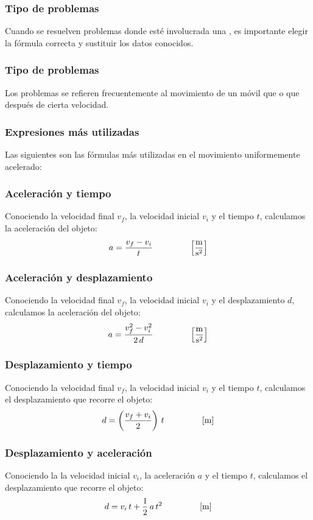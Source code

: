 \documentclass[14pt]{beamer}
\begin{document}
\begin{frame}
\frametitle{Tipo de problemas}
Cuando se resuelven problemas donde esté involucrada una , \pause es importante elegir la fórmula correcta y sustituir los datos conocidos.
\end{frame}
\begin{frame}
\frametitle{Tipo de problemas}
Los problemas se refieren frecuentemente al movimiento de un móvil que  o que  después de cierta velocidad.
\end{frame}
\begin{frame}
\frametitle{Expresiones más utilizadas}
Las siguientes son las fórmulas más utilizadas en el movimiento uniformemente acelerado:
\end{frame}
\begin{frame}
\frametitle{Aceleración y tiempo}
Conociendo la velocidad final $v_{f}$, la velocidad inicial $v_{i}$ y el tiempo $t$, calculamos la aceleración del objeto:
\pause
\begin{align*}
a = \dfrac{v_{f} - v_{i}}{t} \hspace*{1.5cm} \left[ \dfrac{\unit{\meter}}{\unit{\square\second}} \right]
\end{align*}
\end{frame}
\begin{frame}
\frametitle{Aceleración y desplazamiento}
Conociendo la velocidad final $v_{f}$, la velocidad inicial $v_{i}$ y el desplazamiento $d$, calculamos la aceleración del objeto:
\pause
\begin{align*}
a = \dfrac{v_{f}^{2} - v_{i}^{2}}{2 \, d} \hspace*{1.5cm} \left[ \dfrac{\unit{\meter}}{\unit{\square\second}} \right]
\end{align*}
\end{frame}
\begin{frame}
\frametitle{Desplazamiento y tiempo}
Conociendo la velocidad final $v_{f}$, la velocidad inicial $v_{i}$ y el tiempo $t$, calculamos el desplazamiento que recorre el objeto:
\pause
\begin{align*}
d = \left( \dfrac{v_{f} + v_{i}}{2} \right) \, t \hspace*{1.5cm} \left[ \unit{\meter} \right]
\end{align*}
\end{frame}
\begin{frame}
\frametitle{Desplazamiento y aceleración}
Conociendo la la velocidad inicial $v_{i}$, la aceleración $a$ y el tiempo $t$, calculamos el desplazamiento que recorre el objeto:
\pause
\begin{align*}
d = v_{i} \, t + \dfrac{1}{2} \, a \, t^{2} \hspace*{1.5cm} \left[ \unit{\meter} \right]
\end{align*}
\end{frame}
\end{document}
